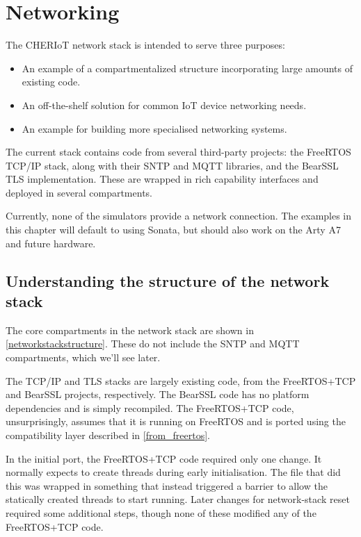 \chapter{Networking}

The CHERIoT network stack is intended to serve three purposes:

\begin{itemize}
	\item{An example of a compartmentalized structure incorporating large amounts of existing code.}
	\item{An off-the-shelf solution for common IoT device networking needs.}
	\item{An example for building more specialised networking systems.}
\end{itemize}

The current stack contains code from several third-party projects: the FreeRTOS TCP/IP stack, along with their SNTP and MQTT libraries, and the BearSSL TLS implementation.
These are wrapped in rich capability interfaces and deployed in several compartments.

\begin{note}
Currently, none of the simulators provide a network connection.
The examples in this chapter will default to using Sonata, but should also work on the Arty A7 and future hardware.
\end{note}

\section{Understanding the structure of the network stack}

The core compartments in the network stack are shown in \ref{networkstackstructure}.
These do not include the SNTP and MQTT compartments, which we'll see later.


The TCP/IP and TLS stacks are largely existing code, from the FreeRTOS+TCP and BearSSL projects, respectively.
The BearSSL code has no platform dependencies and is simply recompiled.
The FreeRTOS+TCP code, unsurprisingly, assumes that it is running on FreeRTOS and is ported using the compatibility layer described in \ref{from_freertos}.

In the initial port, the FreeRTOS+TCP code required only one change.
It normally expects to create threads during early initialisation.
The file that did this was wrapped in something that instead triggered a barrier to allow the statically created threads to start running.
Later changes for network-stack reset required some additional steps, though none of these modified any of the FreeRTOS+TCP code.

